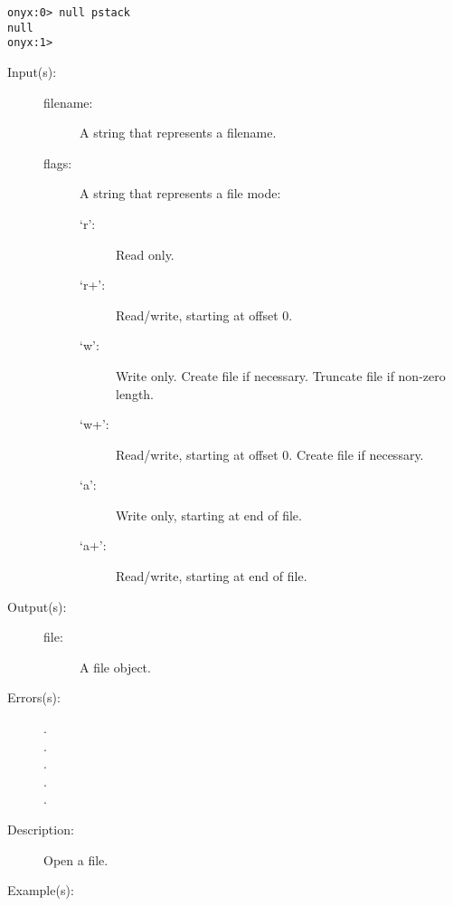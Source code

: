 \begin{description}
\begin{description}
\begin{verbatim}
onyx:0> null pstack
null
onyx:1>
		\end{verbatim}
	\end{description}
\label{systemdict:open}
\item[{\onyxop{filename flags}{open}{file}}: ]
	\begin{description}\item[]
	\item[Input(s): ]
		\begin{description}\item[]
		\item[filename: ]
			A string that represents a filename.
		\item[flags: ]
			A string that represents a file mode:
			\begin{description}\item[]
			\item[`r': ]
				Read only.
			\item[`r+': ]
				Read/write, starting at offset 0.
			\item[`w': ]
				Write only.  Create file if necessary.  Truncate
				file if non-zero length.
			\item[`w+': ]
				Read/write, starting at offset 0.  Create
				file if necessary.
			\item[`a': ]
				Write only, starting at end of file.
			\item[`a+': ]
				Read/write, starting at end of file.
			\end{description}
		\end{description}
	\item[Output(s): ]
		\begin{description}\item[]
		\item[file: ]
			A file object.
		\end{description}
	\item[Errors(s): ]
		\begin{description}\item[]
		\item[.]
		\item[.]
		\item[.]
		\item[.]
		\item[.]
		\end{description}
	\item[Description: ]
		Open a file.
	\item[Example(s): ]\begin{verbatim}


\end{verbatim}
\end{description}
\end{description}
